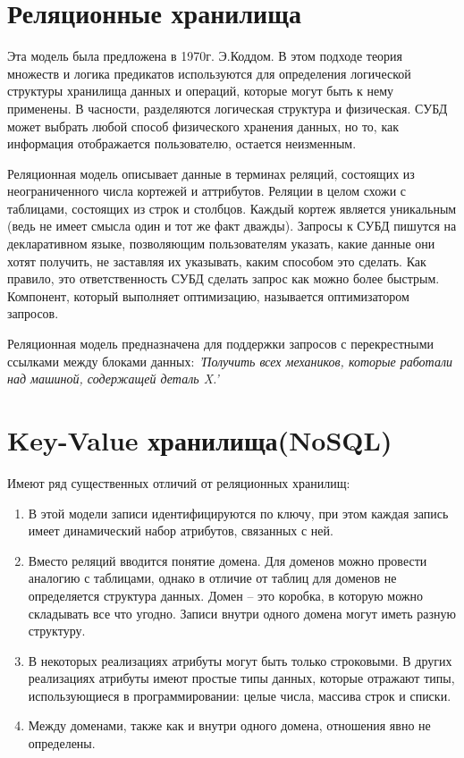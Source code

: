 \documentclass[specialist,subf,href,colorlinks=true
]{disser}
\begin{document}
\section{Реляционные хранилища}
Эта модель была предложена в 1970г. Э.Коддом. В этом подходе теория множеств и логика предикатов используются для определения логической структуры хранилища данных и операций, которые могут быть к нему применены. В часности, разделяются логическая структура и физическая. СУБД может выбрать любой способ физического хранения данных, но то, как информация отображается пользователю, остается неизменным.

Реляционная модель описывает данные в терминах реляций, состоящих из неограниченного числа кортежей и аттрибутов. Реляции в целом схожи с таблицами, состоящих из строк и столбцов. Каждый кортеж является уникальным (ведь не имеет смысла один и тот же факт дважды).  Запросы к СУБД пишутся на декларативном языке, позволяющим пользователям указать, какие данные они хотят получить, не заставляя их указывать, каким способом это сделать. Как правило, это ответственность СУБД сделать запрос как можно более быстрым. Компонент, который выполняет оптимизацию, называется оптимизатором запросов.

Реляционная модель предназначена для поддержки запросов с перекрестными ссылками между блоками данных: 
\textit{
  'Получить всех механиков, которые работали над машиной, содержащей деталь X.'
}

\section{Key-Value хранилища(NoSQL)}
Имеют ряд существенных отличий от реляционных хранилищ:
\begin{enumerate}
\item В этой модели записи идентифицируются по ключу, при этом каждая запись имеет динамический набор атрибутов, связанных с ней.
\item Вместо реляций вводится понятие домена. Для доменов можно провести аналогию с таблицами, однако в отличие от таблиц для доменов не определяется структура данных. Домен – это коробка, в которую можно складывать все что угодно. Записи внутри одного домена могут иметь разную структуру.
\item В некоторых реализациях атрибуты могут быть только строковыми. В других реализациях атрибуты имеют простые типы данных, которые отражают типы, использующиеся в программировании: целые числа, массива строк и списки.
\item Между доменами, также как и внутри одного домена, отношения явно не определены.
\end{enumerate}
\end{document}
